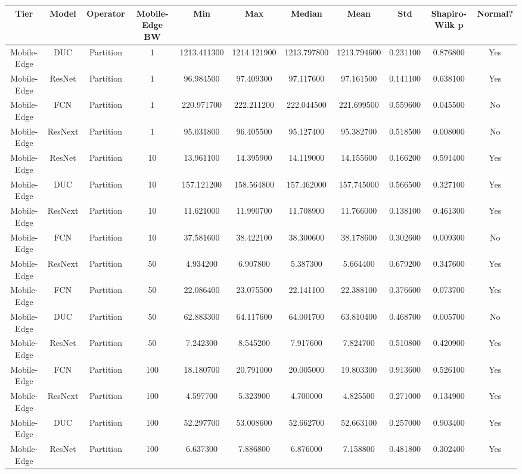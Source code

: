 \begin{tabular}{|c||c||c||c||c||c||c||c||c||c||c|}
\toprule
Tier & Model & Operator & Mobile-Edge BW & Min & Max & Median & Mean & Std & Shapiro-Wilk p & Normal? \\
\midrule
Mobile-Edge & DUC & Partition & 1 & 1213.411300 & 1214.121900 & 1213.797800 & 1213.794600 & 0.231100 & 0.876800 & Yes \\
Mobile-Edge & ResNet & Partition & 1 & 96.984500 & 97.409300 & 97.117600 & 97.161500 & 0.141100 & 0.638100 & Yes \\
Mobile-Edge & FCN & Partition & 1 & 220.971700 & 222.211200 & 222.044500 & 221.699500 & 0.559600 & 0.045500 & No \\
Mobile-Edge & ResNext & Partition & 1 & 95.031800 & 96.405500 & 95.127400 & 95.382700 & 0.518500 & 0.008000 & No \\
Mobile-Edge & ResNet & Partition & 10 & 13.961100 & 14.395900 & 14.119000 & 14.155600 & 0.166200 & 0.591400 & Yes \\
Mobile-Edge & DUC & Partition & 10 & 157.121200 & 158.564800 & 157.462000 & 157.745000 & 0.566500 & 0.327100 & Yes \\
Mobile-Edge & ResNext & Partition & 10 & 11.621000 & 11.990700 & 11.708900 & 11.766000 & 0.138100 & 0.461300 & Yes \\
Mobile-Edge & FCN & Partition & 10 & 37.581600 & 38.422100 & 38.300600 & 38.178600 & 0.302600 & 0.009300 & No \\
Mobile-Edge & ResNext & Partition & 50 & 4.934200 & 6.907800 & 5.387300 & 5.664400 & 0.679200 & 0.347600 & Yes \\
Mobile-Edge & FCN & Partition & 50 & 22.086400 & 23.075500 & 22.141100 & 22.388100 & 0.376600 & 0.073700 & Yes \\
Mobile-Edge & DUC & Partition & 50 & 62.883300 & 64.117600 & 64.001700 & 63.810400 & 0.468700 & 0.005700 & No \\
Mobile-Edge & ResNet & Partition & 50 & 7.242300 & 8.545200 & 7.917600 & 7.824700 & 0.510800 & 0.420900 & Yes \\
Mobile-Edge & FCN & Partition & 100 & 18.180700 & 20.791000 & 20.005000 & 19.803300 & 0.913600 & 0.526100 & Yes \\
Mobile-Edge & ResNext & Partition & 100 & 4.597700 & 5.323900 & 4.700000 & 4.825500 & 0.271000 & 0.134900 & Yes \\
Mobile-Edge & DUC & Partition & 100 & 52.297700 & 53.008600 & 52.662700 & 52.663100 & 0.257000 & 0.903400 & Yes \\
Mobile-Edge & ResNet & Partition & 100 & 6.637300 & 7.886800 & 6.876000 & 7.158800 & 0.481800 & 0.302400 & Yes \\

\end{tabular}
